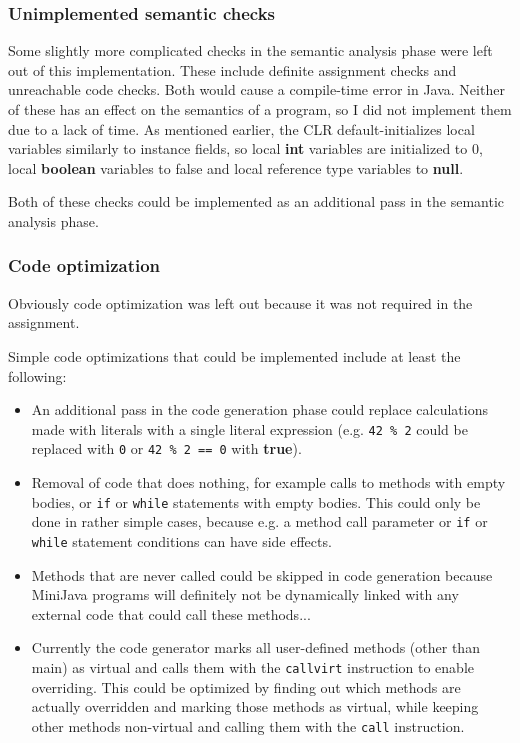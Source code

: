 \documentclass[a4paper,11pt]{article}
\begin{document}
\subsubsection{Unimplemented semantic checks}

Some slightly more complicated checks in the semantic analysis phase were left out of this implementation. These include definite assignment checks and unreachable code checks. Both would cause a compile-time error in Java. Neither of these has an effect on the semantics of a program, so I did not implement them due to a lack of time. As mentioned earlier, the CLR default-initializes local variables similarly to instance fields, so local \textbf{int} variables are initialized to 0, local \textbf{boolean} variables to false and local reference type variables to \textbf{null}.

Both of these checks could be implemented as an additional pass in the semantic analysis phase.

\subsubsection{Code optimization}

Obviously code optimization was left out because it was not required in the assignment.

Simple code optimizations that could be implemented include at least the following:
\begin{itemize}
    \item An additional pass in the code generation phase could replace calculations made with literals with a single literal expression (e.g. \verb,42 % 2, could be replaced with \verb,0, or \verb,42 % 2 == 0, with \textbf{true}).
    \item Removal of code that does nothing, for example calls to methods with empty bodies, or \verb,if, or \verb,while, statements with empty bodies. This could only be done in rather simple cases, because e.g. a method call parameter or \verb,if, or \verb,while, statement conditions can have side effects.
    \item Methods that are never called could be skipped in code generation because MiniJava programs will definitely not be dynamically linked with any external code that could call these methods...
    \item Currently the code generator marks all user-defined methods (other than main) as virtual and calls them with the \verb,callvirt, instruction to enable overriding. This could be optimized by finding out which methods are actually overridden and marking those methods as virtual, while keeping other methods non-virtual and calling them with the \verb,call, instruction.
\end{itemize}
\end{document}
